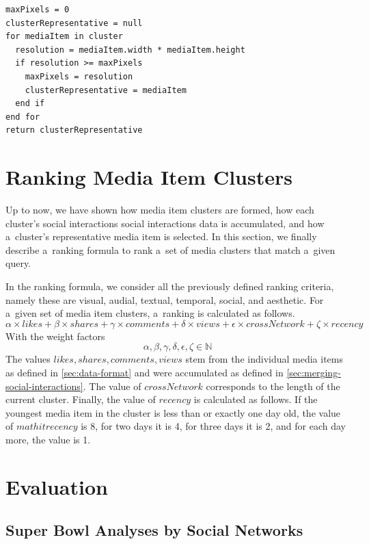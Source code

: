 \begin{lstlisting}[caption=Pseudocode of the cluster representative selection algorithm,
  label=code:clusterrepresentative, float]
maxPixels = 0
clusterRepresentative = null
for mediaItem in cluster
  resolution = mediaItem.width * mediaItem.height
  if resolution >= maxPixels
    maxPixels = resolution
    clusterRepresentative = mediaItem
  end if  
end for
return clusterRepresentative     
\end{lstlisting}

\section{Ranking Media Item Clusters}

Up to now, we have shown how media item clusters are formed,
how each cluster's social interactions social interactions data is accumulated,
and how a~cluster's representative media item is selected.
In this section, we finally describe a~ranking formula to rank
a~set of media clusters that match a~given query.

In the ranking formula, we consider all the previously defined ranking criteria,
namely these are visual, audial, textual, temporal, social, and aesthetic.
For a~given set of media item clusters, a~ranking is calculated as follows.
$$ \alpha \times \mathit{likes} + \beta \times \mathit{shares} +
\gamma \times \mathit{comments} + \delta \times \mathit{views} +
\epsilon \times \mathit{crossNetwork} + \zeta \times \mathit{recency} $$
With the weight factors
$$ \alpha, \beta, \gamma, \delta, \epsilon, \zeta \in \mathbb{N} $$
The values $ \mathit{likes}, \mathit{shares}, \mathit{comments}, \mathit{views} $
stem from the individual media items as defined in \autoref{sec:data-format} and 
were accumulated as defined in \autoref{sec:merging-social-interactions}.
The value of $ \mathit{crossNetwork} $ corresponds to the length of the current cluster. 
Finally, the value of $ \mathit{recency} $ is calculated as follows.
If the youngest media item in the cluster is less than or exactly one day old, the value of
$ mathit{recency} $ is 8, for two days it is 4, for three days it is 2, and for each day more, the value is 1. 

\section{Evaluation}

\subsection{Super Bowl Analyses by Social Networks}

